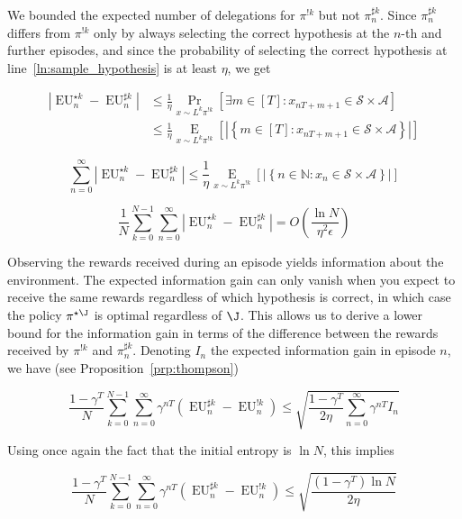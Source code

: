 \documentclass[anon,12pt]{colt2018} %
\newcommand{\AP}[1]{\left(#1\right)}
\newcommand{\AB}[1]{\left[#1\right]}
\newcommand{\AC}[1]{\left\{#1\right\}}
\newcommand{\Pa}[2]{\underset{#1}{\operatorname{Pr}}\AB{#2}}
\newcommand{\Ea}[2]{\underset{#1}{\operatorname{E}}\AB{#2}}
\newcommand{\Nats}{\mathbb{N}}
\newcommand{\Abs}[1]{\left\vert #1 \right\vert}
\newcommand{\A}{\mathcal{A}}
\newcommand{\St}{\mathcal{S}}
\newcommand{\EU}{\operatorname{EU}}
\begin{document}
We bounded the expected number of delegations for $\pi^{!k}$ but not $\pi^{\sharp k}_n$. Since $\pi^{\sharp k}_n$ differs from $\pi^{!k}$ only by always selecting the correct hypothesis at the $n$-th and further episodes, and since the probability of selecting the correct hypothesis at line~\ref{ln:sample_hypothesis} is at least $\eta$, we get

\begin{align*}
\Abs{\EU^{\star k}_n-\EU^{\sharp k}_n} &\leq \frac{1}{\eta}\Pa{x\sim L^k\pi^{!k}}{\exists m \in [T]: x_{nT+m+1}\in\St \times \A} \\ 
&\leq \frac{1}{\eta}\Ea{x\sim L^k\pi^{!k}}{\Abs{\AC{m \in [T]: x_{nT+m+1}\in\St \times \A}}}
\end{align*}

\begin{equation}
\label{eqn:sharp_vs_star_via_delegations}
\sum_{n=0}^\infty {\Abs{\EU^{\star k}_n-\EU^{\sharp k}_n}} \leq \frac{1}{\eta}\Ea{x\sim L^k\pi^{!k}}{\Abs{\AC{n \in \Nats: x_n\in\St \times \A}}}
\end{equation}

\begin{equation}
\label{eqn:sharp_vs_star}
\frac{1}{N}\sum_{k=0}^{N-1}\sum_{n=0}^\infty {\Abs{\EU^{\star k}_n-\EU^{\sharp k}_n}} = O\AP{\frac{\ln{N}}{\eta^2\epsilon}}
\end{equation}

Observing the rewards received during an episode yields information about the environment. The expected information gain can only vanish when you expect to receive the same rewards regardless of which hypothesis is correct, in which case the policy $\pi^{\star\J}$ is optimal regardless of $\J$. This allows us to derive a lower bound for the information gain in terms of the difference between the rewards received by $\pi^{!k}$ and $\pi^{\sharp k}_n$. Denoting $I_n$ the expected information gain in episode $n$, we have (see Proposition~\ref{prp:thompson})

\begin{equation}
\frac{1-\gamma^T}{N}\sum_{k=0}^{N-1}\sum_{n=0}^\infty \gamma^{nT}\AP{\EU^{\sharp k}_n-\EU^{!k}_n} \leq \sqrt{\frac{1-\gamma^T}{2\eta}\sum_{n=0}^\infty \gamma^{nT}I_n}
\end{equation}

Using once again the fact that the initial entropy is $\ln{N}$, this implies

\begin{equation}
\label{eqn:shriek_vs_sharp}
\frac{1-\gamma^T}{N}\sum_{k=0}^{N-1}\sum_{n=0}^\infty \gamma^{nT}\AP{\EU^{\sharp k}_n-\EU^{!k}_n} \leq \sqrt{\frac{\AP{1-\gamma^T}\ln{N}}{2\eta}}
\end{equation}
\end{document}
